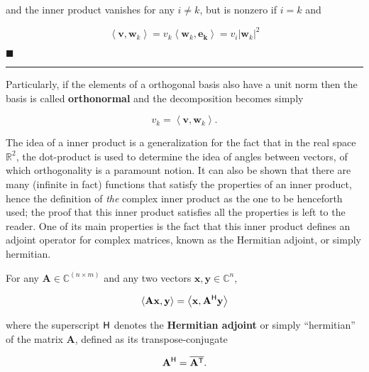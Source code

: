 	\noindent and the inner product vanishes for any $i\neq k$, but is nonzero if $i=k$ and

\begin{equation} \left<\mathbf{v},\mathbf{w}_k\right> = v_k \left<\mathbf{w}_k,\mathbf{e_k}\right> = v_i\left\lvert \mathbf{w}_k\right\rvert^2 \end{equation}

\hfill$\blacksquare$\vspace{3mm}\hrule\vspace{3mm} %

	Particularly, if the elements of a orthogonal basis also have a unit norm then the basis is called \textbf{orthonormal} and the decomposition becomes simply

\begin{equation} v_k = \left<\mathbf{v},\mathbf{w}_k\right> . \label{eq:coordinate_extraction}\end{equation}

	The idea of a inner product is a generalization for the fact that in the real space $\mathbb{R}^2$, the dot-product is used to determine the idea of angles between vectors, of which orthogonality is a paramount notion. It can also be shown that there are many (infinite in fact) functions that satisfy the properties of an inner product, hence the definition of \textit{the} complex inner product as the one to be henceforth used; the proof that this inner product satisfies all the properties is left to the reader. One of its main properties is the fact that this inner product defines an adjoint operator for complex matrices, known as the Hermitian adjoint, or simply hermitian.

\begin{definition} For any $\mathbf{A}\in\mathbb{C}^{(n\times m)}$ and any two vectors $\mathbf{x,y}\in\mathbb{C}^n$,

\begin{equation} \left<\mathbf{Ax},\mathbf{y}\right> = \left<\mathbf{x},\mathbf{A}^{\mathsf{H}}\mathbf{y}\right> \end{equation}

	\noindent where the superscript ${\mathsf{H}}$ denotes the \textbf{Hermitian adjoint} or simply ``hermitian'' of the matrix $\mathbf{A}$, defined as its transpose-conjugate

\begin{equation} \mathbf{A}^{\mathsf{H}} = \overline{\mathbf{A}^{\mathsf{T}}} .\end{equation}

\end{definition}

